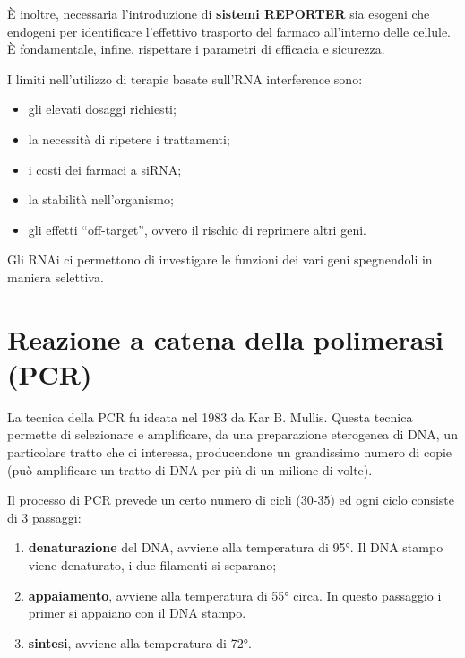 \documentclass[11pt]{book}
\begin{document}
È inoltre, necessaria l'introduzione di \textbf{sistemi REPORTER} sia
esogeni che endogeni per identificare l'effettivo trasporto del farmaco
all'interno delle cellule. È fondamentale, infine, rispettare i
parametri di efficacia e sicurezza.

I limiti nell'utilizzo di terapie basate sull'RNA interference sono:

\begin{itemize}
\itemsep1pt\parskip0pt
\item
  gli elevati dosaggi richiesti;
\item
  la necessità di ripetere i trattamenti;
\item
  i costi dei farmaci a siRNA;
\item
  la stabilità nell'organismo;
\item
  gli effetti ``off-target'', ovvero il rischio di reprimere altri geni.
\end{itemize}

Gli RNAi ci permettono di investigare le funzioni dei vari geni
spegnendoli in maniera selettiva.

\chapter{Reazione a catena della polimerasi
(PCR)}\label{reazione-a-catena-della-polimerasi-pcr}

La tecnica della PCR fu ideata nel 1983 da Kar B. Mullis. Questa tecnica
permette di selezionare e amplificare, da una preparazione eterogenea di
DNA, un particolare tratto che ci interessa, producendone un grandissimo
numero di copie (può amplificare un tratto di DNA per più di un milione
di volte).

Il processo di PCR prevede un certo numero di cicli (30-35) ed ogni
ciclo consiste di 3 passaggi:

\begin{enumerate}
\def\labelenumi{\arabic{enumi}.}
\itemsep1pt\parskip0pt
\item
  \textbf{denaturazione} del DNA, avviene alla temperatura di 95°. Il
  DNA stampo viene denaturato, i due filamenti si separano;
\item
  \textbf{appaiamento}, avviene alla temperatura di 55° circa. In questo
  passaggio i primer si appaiano con il DNA stampo.
\item
  \textbf{sintesi}, avviene alla temperatura di 72°.
\end{enumerate}
\end{document}
